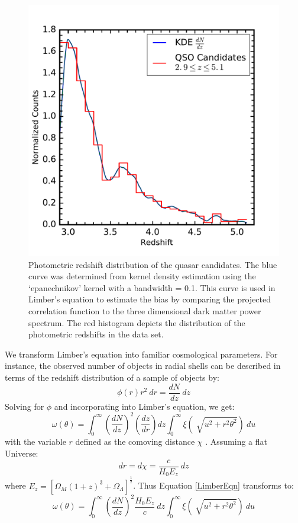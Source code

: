 \documentclass[apj, numberedappendix]{emulateapj}
\begin{document}
\begin{figure}[ht!]
 \centering
 \includegraphics[scale=0.45]{./New_Plots/dndz.pdf}
 \caption{\footnotesize{Photometric redshift distribution of the quasar candidates. The blue curve was determined from kernel density estimation using the `epanechnikov' kernel with a bandwidth = 0.1. This curve is used in Limber's equation to estimate the bias by comparing the projected correlation function to the three dimensional dark matter power spectrum. The red histogram depicts the distribution of the photometric redshifts in the data set.}}
 \label{dndz}
 \end{figure}

We transform Limber's equation into familiar cosmological parameters. For instance, the observed number of objects in radial shells can be described in terms of the redshift distribution of a sample of objects by:
\begin{equation}
\phi(r)r^2\ dr = \frac{dN}{dz}\ dz
\end{equation}
Solving for $\phi$ and incorporating into Limber's equation, we get:
\begin{equation}
\omega(\theta) = \int_{0}^{\infty} \left(\frac{dN}{dz}\right)^2\left(\frac{dz}{dr}\right) dz \int_{0}^{\infty} \xi(\sqrt[]{u^2 + r^2\theta^2})\ du
\end{equation}
with the variable $r$ defined as the comoving distance $\chi$ \citep{Brewer2008}. Assuming a flat Universe:
\begin{equation}
dr=d\chi = \frac{c}{H_0E_z}\ dz
\end{equation}
where $E_z =[\Omega_M(1+z)^3 + \Omega_{\Lambda}]^{\frac{1}{2}}$. Thus Equation \eqref{LimberEqn} transforms to:
\begin{equation}
\omega(\theta) = \int_{0}^{\infty} \left(\frac{dN}{dz}\right)^2\frac{H_0E_z}{c}\ dz \int_{0}^{\infty} \xi(\sqrt[]{u^2 + r^2\theta^2})\ du
\end{equation}
\end{document}
